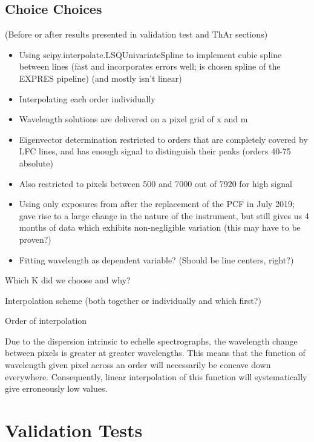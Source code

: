 \documentclass[12pt, letterpaper]{article}
\begin{document}
\subsection{Choice Choices} \label{sec:choices}
(Before or after results presented in validation test and ThAr sections)
\begin{itemize}
	\item Using scipy.interpolate.LSQUnivariateSpline to implement cubic spline between lines (fast and incorporates errors well; is chosen spline of the EXPRES pipeline) (and mostly isn't linear)
	\item Interpolating each order individually
	\item Wavelength solutions are delivered on a pixel grid of x and m
	\item Eigenvector determination restricted to orders that are completely covered by LFC lines, and has enough signal to distinguish their peaks (orders 40-75 absolute)
	\item Also restricted to pixels between 500 and 7000 out of 7920 for high signal
	\item Using only exposures from after the replacement of the PCF in July 2019; gave rise to a large change in the nature of the instrument, but still gives us 4 months of data which exhibits non-negligible variation (this may have to be proven?)
	\item Fitting wavelength as dependent variable?  (Should be line centers, right?)
\end{itemize}

Which K did we choose and why?

Interpolation scheme (both together or individually and which first?)

Order of interpolation

Due to the dispersion intrinsic to echelle spectrographs, the wavelength change between pixels is greater at greater wavelengths.  This means that the function of wavelength given pixel across an order will necessarily be concave down everywhere.  Consequently, linear interpolation of this function will systematically give erroneously low values.

\section{Validation Tests}
\end{document}
